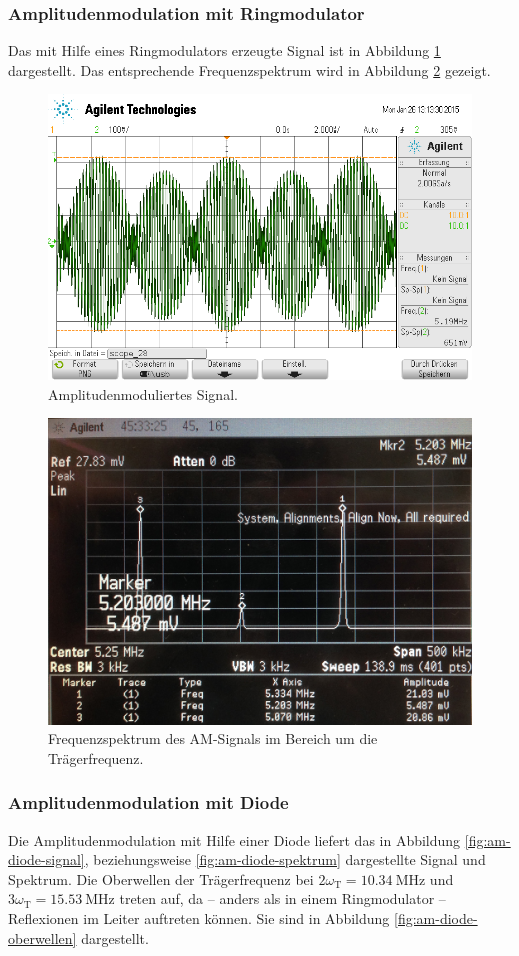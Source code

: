 \subsubsection{Amplitudenmodulation mit Ringmodulator}
\label{subsubsec:am-ringmodulator}
Das mit Hilfe eines Ringmodulators erzeugte Signal ist in Abbildung
\ref{fig:am-signal} dargestellt.
Das entsprechende Frequenzspektrum wird in Abbildung \ref{fig:am-spektrum}
gezeigt.
\begin{figure}
    \centering
    \includegraphics[width=0.8\linewidth]{images/am-signal.png}
    \caption{Amplitudenmoduliertes Signal.}
    \label{fig:am-signal}
\end{figure}
\begin{figure}
    \centering
    \includegraphics[width=0.8\linewidth]{images/am-spektrum.jpg}
    \caption{
        Frequenzspektrum des AM-Signals im Bereich um die
        Trägerfrequenz.
    }
    \label{fig:am-spektrum}
\end{figure}

\subsubsection{Amplitudenmodulation mit Diode}
\label{subsubsec:am-ringmodulator}
Die Amplitudenmodulation mit Hilfe einer Diode liefert das in Abbildung
\ref{fig:am-diode-signal}, beziehungsweise \ref{fig:am-diode-spektrum}
dargestellte Signal und Spektrum. Die Oberwellen der Trägerfrequenz bei
$2\omega_\text{T} = \SI{10.34}{\mega\hertz}$ und
$3\omega_\text{T} = \SI{15.53}{\mega\hertz}$ treten auf, da -- anders als in
einem Ringmodulator -- Reflexionen im Leiter auftreten können.
Sie sind in Abbildung \ref{fig:am-diode-oberwellen} dargestellt.

